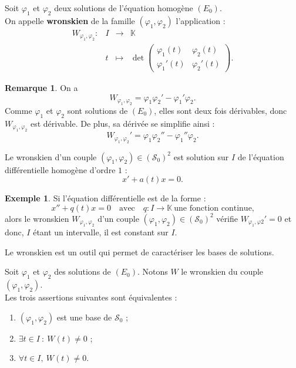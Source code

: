 \documentclass[french]{article}
\newcommand{\K}{\mathbb{K}}
\theoremstyle{plain}
\theoremstyle{definition}
\newtheorem*{ex}{Exemple}
\newtheorem*{rmq}{Remarque}
\theoremstyle{remark}
\begin{document}
\begin{dfn}
	Soit $\varphi_1$ et $\varphi_2$ deux solutions de l'équation homogène $(E_0)$. \\
	On appelle \textbf{wronskien} de la famille $(\varphi_1,\varphi_2)$ l'application :
	$$\begin{array}{lrcl}
		W_{\varphi_1,\varphi_2}:&I&\longrightarrow&\K\\
		&t&\longmapsto&\displaystyle\det\begin{pmatrix}
			\varphi_1(t)&\varphi_2(t)\\
			\varphi_1'(t)&\varphi_2'(t)
		\end{pmatrix}.
	\end{array}$$
\end{dfn}

\begin{rmq}
	On a $$W_{\varphi_1,\varphi_2}=\varphi_1\varphi_2'-\varphi_1'\varphi_2.$$
	Comme $\varphi_1$ et $\varphi_2$ sont solutions de $(E_0)$, elles sont deux fois dérivables, donc $W_{\varphi_1,\varphi_2}$ est dérivable. De plus, sa dérivée se simplifie ainsi :
	$$W_{\varphi_1,\varphi_2}'=\varphi_1\varphi_2''-\varphi_1''\varphi_2.$$
\end{rmq}

\begin{prop}%
	Le wronskien d'un couple $(\varphi_1,\varphi_2)\in(\mathcal{S}_0)^2$ est solution sur $I$ de l'équation différentielle homogène d'ordre $1$ :
	$$x'+a(t)x=0.$$
\end{prop}

\begin{ex}
	Si l'équation différentielle est de la forme :
	$$x''+q(t)x=0\quad\text{avec}\quad q:I\to\K\ \text{une fonction continue,}$$
	alors le wronskien $W_{\varphi_1,\varphi_2}$ d'un couple $(\varphi_1,\varphi_2)\in(\mathcal{S}_0)^2$ vérifie $W_{\varphi_1,\varphi2}'=0$ et donc, $I$ étant un intervalle, il est constant sur $I$.
\end{ex}

Le wronskien est un outil qui permet de caractériser les bases de solutions.

\begin{prop}%
	Soit $\varphi_1$ et $\varphi_2$ des solutions de $(E_0)$. Notons $W$ le wronskien du couple $(\varphi_1,\varphi_2)$.\\
	Les trois assertions suivantes sont équivalentes :
	\begin{enumerate}[label=(\roman*)]
		\item $(\varphi_1,\varphi_2)$ est une base de $\mathcal{S}_0$ ;
		\item $\exists t\in I\ :\ W(t)\ne 0$ ;
		\item $\forall t\in I,\ W(t)\ne0$.
	\end{enumerate}
\end{prop}
\end{document}
